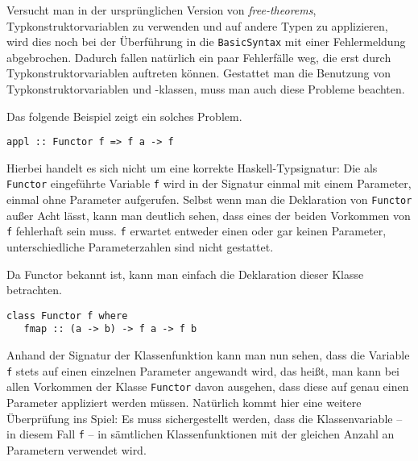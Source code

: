 Versucht man in der ursprünglichen Version von \textit{free-theorems}, Typkonstruktorvariablen zu verwenden und auf
andere Typen zu applizieren, wird dies noch bei der Überführung in die \texttt{BasicSyntax} mit einer Fehlermeldung abgebrochen.
Dadurch fallen natürlich ein paar Fehlerfälle weg, die erst durch Typkonstruktorvariablen auftreten können. Gestattet man
die Benutzung von Typkonstruktorvariablen und -klassen, muss man auch diese Probleme beachten.


Das folgende Beispiel zeigt ein solches Problem.

\begin{verbatim}
appl :: Functor f => f a -> f
\end{verbatim}

Hierbei handelt es sich nicht um eine korrekte Haskell-Typsignatur: Die als \texttt{Functor} eingeführte Variable \texttt{f} wird in der Signatur
einmal mit einem Parameter, einmal ohne Parameter aufgerufen. Selbst wenn man die Deklaration von \texttt{Functor}
außer Acht lässt, kann man deutlich sehen, dass eines der beiden Vorkommen von \texttt{f} fehlerhaft sein muss. \texttt{f} erwartet
entweder einen oder gar keinen Parameter, unterschiedliche Parameterzahlen sind nicht gestattet.

Da Functor bekannt ist, kann man einfach die Deklaration dieser Klasse betrachten.

\begin{verbatim}
class Functor f where
   fmap :: (a -> b) -> f a -> f b
\end{verbatim}

Anhand der Signatur der Klassenfunktion kann man nun sehen, dass die Variable \texttt{f} stets auf einen einzelnen 
Parameter angewandt wird, das heißt, man kann bei allen Vorkommen der Klasse \texttt{Functor} davon ausgehen, dass diese
auf genau einen Parameter appliziert werden müssen. Natürlich kommt hier eine weitere Überprüfung ins Spiel: Es muss
sichergestellt werden, dass die Klassenvariable -- in diesem Fall \texttt{f} -- in sämtlichen Klassenfunktionen mit der gleichen Anzahl
an Parametern verwendet wird.

